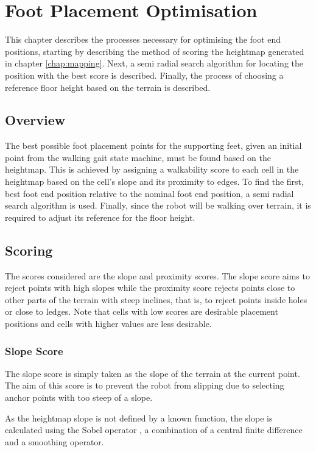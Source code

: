 \chapter{Foot Placement Optimisation} \label{chap:optimisation}
This chapter describes the processes necessary for optimising the foot end positions, starting by describing the method of scoring the heightmap generated in chapter \ref{chap:mapping}. Next, a semi radial search algorithm for locating the position with the best score is described. Finally, the process of choosing a reference floor height based on the terrain is described.

\section{Overview}
    The best possible foot placement points for the supporting feet, given an initial point from the walking gait state machine, must be found based on the heightmap. This is achieved by assigning a walkability score to each cell in the heightmap based on the cell's slope and its proximity to edges. To find the first, best foot end position relative to the nominal foot end position, a semi radial search algorithm is used. Finally, since the robot will be walking over terrain, it is required to adjust its reference for the floor height. 

\section{Scoring} \label{sec:scores}
    The scores considered are the slope and proximity scores. The slope score aims to reject points with high slopes while the proximity score rejects points close
    to other parts of the terrain with steep inclines, that is, to reject points inside holes or close to ledges. Note that cells with low scores are desirable placement positions and cells with higher values are less desirable.
    \subsection{Slope Score}
        The slope score is simply taken as the slope of the terrain at the current point. The aim of this score is to prevent the robot from slipping due to
        selecting anchor points with too steep of a slope.
        
        \noindent
        As the heightmap slope is not defined by a known function, the slope is calculated using the Sobel
        operator \citep{sobel2014}, a combination of a central finite difference and a smoothing operator.

